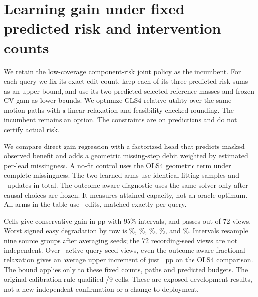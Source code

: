 \section*{Learning gain under fixed predicted risk and intervention counts}
We retain the low-coverage component-risk joint policy as the incumbent. For
each query we fix its exact edit count, keep each of its three predicted
risk sums as an upper bound, and use its two predicted selected reference
masses and frozen CV gain as lower bounds. We optimize OLS4-relative utility
over the same motion paths with a linear relaxation and feasibility-checked
rounding. The incumbent remains an option. The constraints are on predictions
and do not certify actual risk.

We compare direct gain regression with a factorized head that predicts
masked observed benefit and adds a geometric missing-step debit weighted by
estimated per-lead missingness. A no-fit control uses the OLS4 geometric term
under complete missingness. The two learned arms use identical fitting
samples and \FixedGainUpdates\ updates in total. The outcome-aware diagnostic
uses the same solver only after causal choices are frozen. It measures
attained capacity, not an oracle optimum. All arms in the table use
\FixedGainEdits\ edits, matched exactly per query.

\begin{center}
\small
{}
\end{center}
Cells give conservative gain in pp with 95\% intervals, and passes out of
72 views. Worst signed easy degradation by row is \FixedGainAnchorEasy\%,
\FixedGainGeometryEasy\%, \FixedGainDirectEasy\%, \FixedGainFactorEasy\%,
and \FixedGainHindsightEasy\%. Intervals resample nine source groups after
averaging seeds; the 72 recording-seed views are not independent.
Over \FixedGainQueries\ active query-seed views, even the outcome-aware
fractional relaxation gives an average upper increment of just
\FixedGainCapacity\ pp on the OLS4 comparison. The bound applies only to
these fixed counts, paths and predicted budgets. The original calibration rule
qualified \FixedGainQualified/9 cells. These are exposed development results,
not a new independent confirmation or a change to deployment.
